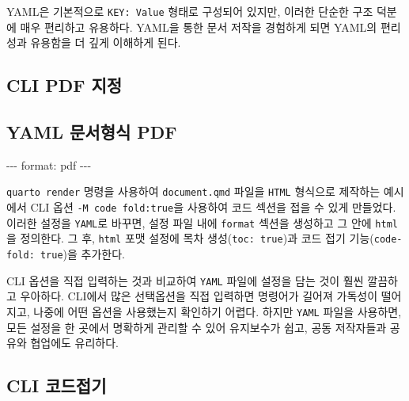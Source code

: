 \documentclass[
  letterpaper,
]{book}
\newenvironment{Shaded}{\begin{snugshade}}{\end{snugshade}}
\newcommand{\AttributeTok}[1]{\textcolor[rgb]{0.40,0.45,0.13}{#1}}
\newcommand{\ExtensionTok}[1]{\textcolor[rgb]{0.00,0.23,0.31}{#1}}
\newcommand{\FunctionTok}[1]{\textcolor[rgb]{0.28,0.35,0.67}{#1}}
\newcommand{\KeywordTok}[1]{\textcolor[rgb]{0.00,0.23,0.31}{#1}}
\newcommand{\NormalTok}[1]{\textcolor[rgb]{0.00,0.23,0.31}{#1}}
\newcommand{\PreprocessorTok}[1]{\textcolor[rgb]{0.68,0.00,0.00}{#1}}
\begin{document}
YAML은 기본적으로 \texttt{KEY:\ Value} 형태로 구성되어 있지만, 이러한
단순한 구조 덕분에 매우 편리하고 유용하다. YAML을 통한 문서 저작을
경험하게 되면 YAML의 편리성과 유용함을 더 깊게 이해하게 된다.

\hypertarget{cli-pdf-uxc9c0uxc815}{%
\subsection*{CLI PDF 지정}\label{cli-pdf-uxc9c0uxc815}}

\begin{Shaded}
\end{Shaded}

\hypertarget{yaml-uxbb38uxc11cuxd615uxc2dd-pdf}{%
\subsection*{YAML 문서형식
PDF}\label{yaml-uxbb38uxc11cuxd615uxc2dd-pdf}}

\begin{Shaded}
\begin{Highlighting}[]
\PreprocessorTok{{-}{-}{-}}
\FunctionTok{format}\KeywordTok{:}\AttributeTok{ pdf}
\PreprocessorTok{{-}{-}{-}}
\end{Highlighting}
\end{Shaded}

\texttt{quarto\ render} 명령을 사용하여 \texttt{document.qmd} 파일을
\texttt{HTML} 형식으로 제작하는 예시에서 CLI 옵션
\texttt{-M\ code\ fold:true}을 사용하여 코드 섹션을 접을 수 있게
만들었다. 이러한 설정을 \texttt{YAML}로 바꾸면, 설정 파일 내에
\texttt{format} 섹션을 생성하고 그 안에 \texttt{html}을 정의한다. 그 후,
\texttt{html} 포맷 설정에 목차 생성(\texttt{toc:\ true})과 코드 접기
기능(\texttt{code-fold:\ true})을 추가한다.

CLI 옵션을 직접 입력하는 것과 비교하여 \texttt{YAML} 파일에 설정을 담는
것이 훨씬 깔끔하고 우아하다. CLI에서 많은 선택옵션을 직접 입력하면
명령어가 길어져 가독성이 떨어지고, 나중에 어떤 옵션을 사용했는지
확인하기 어렵다. 하지만 \texttt{YAML} 파일을 사용하면, 모든 설정을 한
곳에서 명확하게 관리할 수 있어 유지보수가 쉽고, 공동 저작자들과 공유와
협업에도 유리하다.

\hypertarget{cli-uxcf54uxb4dcuxc811uxae30}{%
\subsection*{CLI 코드접기}\label{cli-uxcf54uxb4dcuxc811uxae30}}
\end{document}
